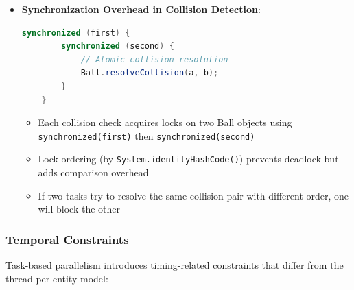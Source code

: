\documentclass[12pt,a4paper]{article}
\begin{document}
\begin{itemize}
    \item \textbf{Synchronization Overhead in Collision Detection}:
    
    \begin{lstlisting}[language=Java, caption=Ordered Lock Acquisition]
    synchronized (first) {
        synchronized (second) {
            // Atomic collision resolution
            Ball.resolveCollision(a, b);
        }
    }
        \end{lstlisting}

    \begin{itemize}
        \item Each collision check acquires locks on two Ball objects using \texttt{synchronized(first)} then \texttt{synchronized(second)}
        \item Lock ordering (by \texttt{System.identityHashCode()}) prevents deadlock but adds comparison overhead
        \item If two tasks try to resolve the same collision pair with different order, one will block the other

    \end{itemize}
\end{itemize}

\subsubsection{Temporal Constraints}
Task-based parallelism introduces timing-related constraints that differ from the thread-per-entity model:
 
\end{document}
